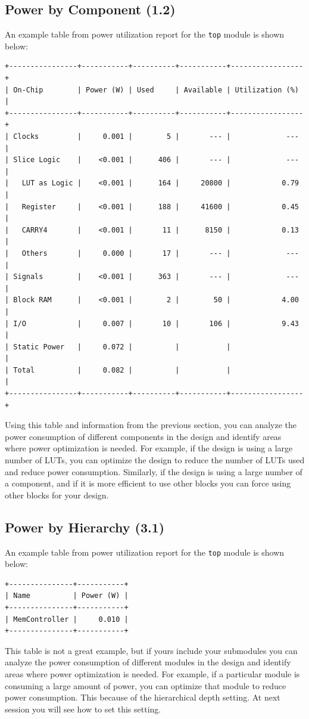 \documentclass{report}
\begin{document}
\subsection{Power by Component (1.2)}
An example table from power utilization report for the \texttt{top} module is shown below:
\begin{verbatim}
+----------------+-----------+----------+-----------+-----------------+
| On-Chip        | Power (W) | Used     | Available | Utilization (%) |
+----------------+-----------+----------+-----------+-----------------+
| Clocks         |     0.001 |        5 |       --- |             --- |
| Slice Logic    |    <0.001 |      406 |       --- |             --- |
|   LUT as Logic |    <0.001 |      164 |     20800 |            0.79 |
|   Register     |    <0.001 |      188 |     41600 |            0.45 |
|   CARRY4       |    <0.001 |       11 |      8150 |            0.13 |
|   Others       |     0.000 |       17 |       --- |             --- |
| Signals        |    <0.001 |      363 |       --- |             --- |
| Block RAM      |    <0.001 |        2 |        50 |            4.00 |
| I/O            |     0.007 |       10 |       106 |            9.43 |
| Static Power   |     0.072 |          |           |                 |
| Total          |     0.082 |          |           |                 |
+----------------+-----------+----------+-----------+-----------------+
\end{verbatim}
Using this table and information from the previous section, you can analyze the power consumption of different components in the design and identify areas where power optimization is needed. For example, if the design is using a large number of LUTs, you can optimize the design to reduce the number of LUTs used and reduce power consumption. Similarly, if the design is using a large number of a component, and if it is more efficient to use other blocks you can force using other blocks for your design.

\subsection{Power by Hierarchy (3.1)}
An example table from power utilization report for the \texttt{top} module is shown below:
\begin{verbatim}
+---------------+-----------+
| Name          | Power (W) |
+---------------+-----------+
| MemController |     0.010 |
+---------------+-----------+
\end{verbatim}
This table is not a great example, but if yours include your submodules you can analyze the power consumption of different modules in the design and identify areas where power optimization is needed. For example, if a particular module is consuming a large amount of power, you can optimize that module to reduce power consumption. This because of the hierarchical depth setting. At next session you will see how to set this setting.
\end{document}
